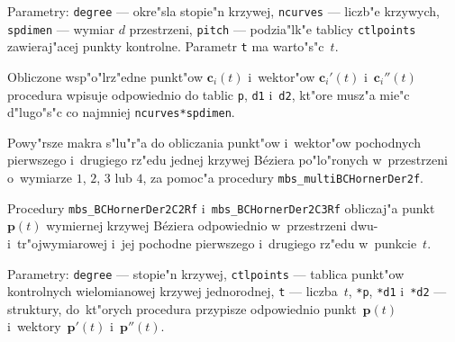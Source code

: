 Parametry: \texttt{degree} --- okre"sla stopie"n krzywej, \texttt{ncurves}
--- liczb"e krzywych, \texttt{spdimen} --- wymiar $d$ przestrzeni,
\texttt{pitch} --- podzia"lk"e tablicy \texttt{ctlpoints} zawieraj"acej
punkty kontrolne. Parametr \texttt{t} ma warto"s"c~$t$.

Obliczone wsp"o"lrz"edne punkt"ow $\bm{c}_i(t)$ i~wektor"ow $\bm{c}_i'(t)$
i~$\bm{c}_i''(t)$ procedura
wpisuje odpowiednio do tablic \texttt{p}, \texttt{d1} i~\texttt{d2},
kt"ore musz"a mie"c d"lugo"s"c co najmniej \texttt{ncurves*spdimen}.

\vspace{\bigskipamount}
Powy"rsze makra s"lu"r"a do obliczania punkt"ow i~wektor"ow pochodnych
pierwszego i~drugiego rz"edu jednej krzywej B\'{e}ziera po"lo"ronych
w~przestrzeni o~wymiarze $1$, $2$, $3$ lub $4$, za pomoc"a procedury
\texttt{mbs\_multiBCHornerDer2f}.

\vspace{\bigskipamount}
Procedury \texttt{mbs\_BCHornerDer2C2Rf} i~\texttt{mbs\_BCHornerDer2C3Rf}
obliczaj"a punkt $\bm{p}(t)$ wymiernej krzywej B\'{e}ziera odpowiednio
w~przestrzeni dwu- i~tr"ojwymiarowej i~jej pochodne pierwszego i~drugiego
rz"edu w~punkcie~$t$.

Parametry: \texttt{degree} --- stopie"n krzywej, \texttt{ctlpoints} ---
tablica punkt"ow kontrolnych wielomianowej krzywej jednorodnej, \texttt{t}
--- liczba~$t$, \texttt{*p}, \texttt{*d1} i~\texttt{*d2} --- struktury,
do~kt"orych procedura przypisze odpowiednio punkt~$\bm{p}(t)$
i~wektory~$\bm{p}'(t)$ i~$\bm{p}''(t)$.

